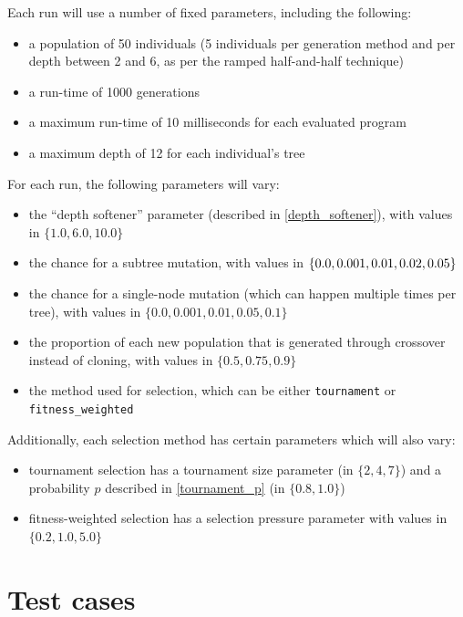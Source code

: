 \documentclass{report}
\begin{document}
Each run will use a number of fixed parameters, including the following:

\begin{itemize}
    \item a population of 50 individuals (5 individuals per generation method and per depth between 2 and 6, as per the ramped half-and-half technique)
    \item a run-time of 1000 generations
    \item a maximum run-time of 10 milliseconds for each evaluated program
    \item a maximum depth of 12 for each individual's tree
\end{itemize}

For each run, the following parameters will vary:

\begin{itemize}
    \item the ``depth softener'' parameter (described in \autoref{depth_softener}), with values in $\{1.0, 6.0, 10.0\}$
    \item the chance for a subtree mutation, with values in $\{0.0, 0.001, 0.01, \linebreak 0.02, 0.05\}$
    \item the chance for a single-node mutation (which can happen multiple times per tree), with values in $\{0.0, 0.001, 0.01, 0.05, 0.1\}$
    \item the proportion of each new population that is generated through crossover instead of cloning, with values in $\{0.5, 0.75, 0.9\}$
    \item the method used for selection, which can be either \verb|tournament| or \linebreak
    \verb|fitness_weighted|
\end{itemize}

Additionally, each selection method has certain parameters which will also vary:

\begin{itemize}
    \item tournament selection has a tournament size parameter (in $\{2, 4, 7\}$) and a probability $p$ described in \autoref{tournament_p} (in $\{0.8, 1.0\}$)
    \item fitness-weighted selection has a selection pressure parameter with values in $\{0.2, 1.0, 5.0\}$
\end{itemize}

\section{Test cases}
\end{document}
